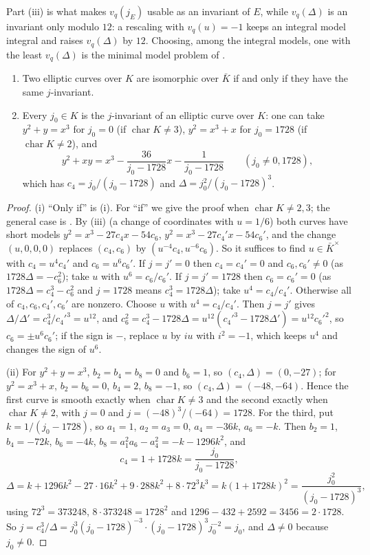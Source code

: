 Part (iii) is what makes $v_q(j_E)$ usable as an invariant of $E$, while $v_q(\Delta)$ is an invariant only modulo $12$: a rescaling with $v_q(u)=-1$ keeps an
integral model integral and raises $v_q(\Delta)$ by $12$. Choosing, among the integral models, one with the least $v_q(\Delta)$ is the minimal model problem
of .

\begin{theorem}\label{thm:ellcurves:jinv}
\leavevmode
\begin{enumerate}[label=(\roman*)]
\item Two elliptic curves over $K$ are isomorphic over $\bar K$ if and only if they have the same $j$-invariant.
\item Every $j_0\in K$ is the $j$-invariant of an elliptic curve over $K$: one can take $y^2+y=x^3$ for $j_0=0$ (if $\operatorname{char}K\ne3$),
$y^2=x^3+x$ for $j_0=1728$ (if $\operatorname{char}K\ne2$), and
\[
y^2+xy=x^3-\frac{36}{j_0-1728}x-\frac1{j_0-1728}\qquad(j_0\ne0,1728),
\]
which has $c_4=j_0/(j_0-1728)$ and $\Delta=j_0^2/(j_0-1728)^3$.
\end{enumerate}
\end{theorem}

\begin{proof}
(i) ``Only if'' is (i). For ``if'' we give the proof when $\operatorname{char}K\ne2,3$; the general case is
\cite[Appendix A]{SilvermanAEC}. By (iii) (a change of coordinates with $u=1/6$) both curves have short models
$y^2=x^3-27c_4x-54c_6$, $y^2=x^3-27c_4'x-54c_6'$, and the change $(u,0,0,0)$ replaces $(c_4,c_6)$ by $(u^{-4}c_4,u^{-6}c_6)$. So it suffices to find
$u\in\bar K^\times$ with $c_4=u^4c_4'$ and $c_6=u^6c_6'$. If $j=j'=0$ then $c_4=c_4'=0$ and $c_6,c_6'\ne0$ (as $1728\Delta=-c_6^2$); take $u$ with
$u^6=c_6/c_6'$. If $j=j'=1728$ then $c_6=c_6'=0$ (as $1728\Delta=c_4^3-c_6^2$ and $j=1728$ means $c_4^3=1728\Delta$); take $u^4=c_4/c_4'$. Otherwise all of
$c_4,c_6,c_4',c_6'$ are nonzero. Choose $u$ with $u^4=c_4/c_4'$. Then $j=j'$ gives $\Delta/\Delta'=c_4^3/c_4'^3=u^{12}$, and
$c_6^2=c_4^3-1728\Delta=u^{12}(c_4'^3-1728\Delta')=u^{12}c_6'^2$, so $c_6=\pm u^6c_6'$; if the sign is $-$, replace $u$ by $iu$ with $i^2=-1$, which keeps $u^4$
and changes the sign of $u^6$.

(ii) For $y^2+y=x^3$, $b_2=b_4=b_8=0$ and $b_6=1$, so $(c_4,\Delta)=(0,-27)$; for $y^2=x^3+x$, $b_2=b_6=0$, $b_4=2$, $b_8=-1$, so $(c_4,\Delta)=(-48,-64)$.
Hence the first curve is smooth exactly when $\operatorname{char}K\ne3$ and the second exactly when $\operatorname{char}K\ne2$, with $j=0$ and $j=(-48)^3/(-64)=1728$. For the third,
put $k=1/(j_0-1728)$, so $a_1=1$, $a_2=a_3=0$, $a_4=-36k$, $a_6=-k$. Then $b_2=1$, $b_4=-72k$, $b_6=-4k$, $b_8=a_1^2a_6-a_4^2=-k-1296k^2$, and
\[
c_4=1+1728k=\frac{j_0}{j_0-1728},
\]
\[
\Delta=k+1296k^2-27\cdot16k^2+9\cdot288k^2+8\cdot72^3k^3=k(1+1728k)^2=\frac{j_0^2}{(j_0-1728)^3},
\]
using $72^3=373248$, $8\cdot373248=1728^2$ and $1296-432+2592=3456=2\cdot1728$. So $j=c_4^3/\Delta=j_0^3(j_0-1728)^{-3}\cdot(j_0-1728)^3j_0^{-2}=j_0$, and
$\Delta\ne0$ because $j_0\ne0$.
\end{proof}

